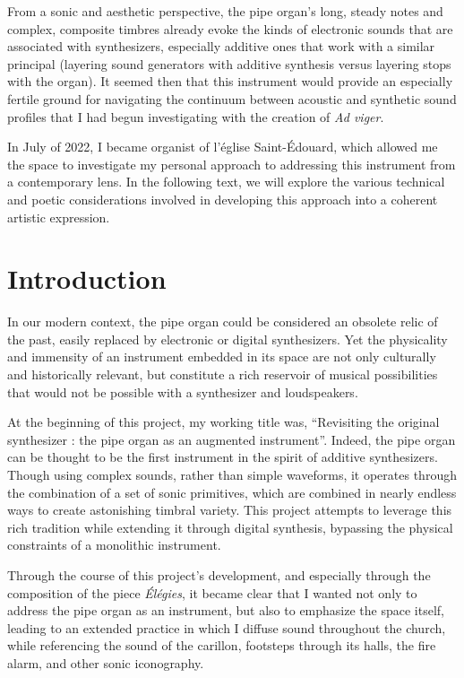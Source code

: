 \documentclass[12pt,twoside,maitrise]{dms_ks}
\theoremstyle{definition}
\begin{document}
 From a sonic and aesthetic perspective, the pipe organ's long, steady notes and complex, composite timbres already evoke the kinds of electronic sounds that are associated with synthesizers, especially additive ones that work with a similar principal (layering sound generators with additive synthesis versus layering stops with the organ). 
It seemed then that this instrument would provide an especially fertile ground for navigating the continuum between acoustic and synthetic sound profiles that I had begun investigating with the creation of \textit{Ad viger}.

In July of 2022, I became organist of l'église Saint-Édouard, which allowed me the space to investigate my personal approach to addressing this instrument from a contemporary lens. In the following text, we will explore the various technical and poetic considerations involved in developing this approach into a coherent artistic expression. 

\chapter*{Introduction}

In our modern context, the pipe organ could be considered an obsolete relic of the past, easily replaced by electronic or digital synthesizers. 
Yet the physicality and immensity of an instrument embedded in its space are not only culturally and historically relevant, but constitute a rich reservoir of musical possibilities that would not be possible with a synthesizer and loudspeakers. 

At the beginning of this project, my working title was, “Revisiting the original synthesizer : the pipe organ as an augmented instrument”. 
Indeed, the pipe organ can be thought to be the first instrument in the spirit of additive synthesizers. 
Though using complex sounds, rather than simple waveforms, it operates through the combination of a set of sonic primitives, which are combined in nearly endless ways to create astonishing timbral variety. 
This project attempts to leverage this rich tradition while extending it through digital synthesis, bypassing the physical constraints of a monolithic instrument.	

Through the course of this project’s development, and especially through the composition of the piece \textit{Élégies}, it became clear that I wanted not only to address the pipe organ as an instrument, but also to emphasize the space itself, leading to an extended practice in which I diffuse sound throughout the church, while referencing the sound of the carillon, footsteps through its halls, the fire alarm, and other sonic iconography. 	
\end{document}
